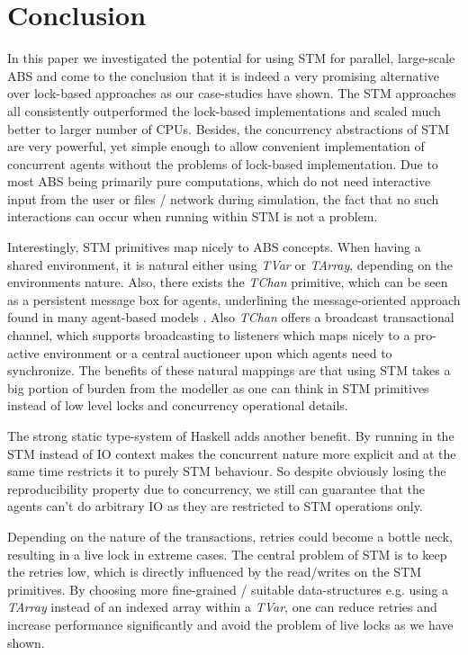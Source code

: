 \section{Conclusion} %
\label{sec:conclusion}

In this paper we investigated the potential for using STM for parallel, large-scale ABS and come to the conclusion that it is indeed a very promising alternative over lock-based approaches as our case-studies have shown. The STM approaches all consistently outperformed the lock-based implementations and scaled much better to larger number of CPUs. Besides, the concurrency abstractions of STM are very powerful, yet simple enough to allow convenient implementation of concurrent agents without the problems of lock-based implementation. Due to most ABS being primarily pure computations, which do not need interactive input from the user or files / network during simulation, the fact that no such interactions can occur when running within STM is not a problem. 

Interestingly, STM primitives map nicely to ABS concepts. When having a shared environment, it is natural either using \textit{TVar} or \textit{TArray}, depending on the environments nature. Also, there exists the \textit{TChan} primitive, which can be seen as a persistent message box for agents, underlining the message-oriented approach found in many agent-based models \cite{agha_actors:_1986, wooldridge_introduction_2009}. Also \textit{TChan} offers a broadcast transactional channel, which supports broadcasting to listeners which maps nicely to a pro-active environment or a central auctioneer upon which agents need to synchronize. The benefits of these natural mappings are that using STM takes a big portion of burden from the modeller as one can think in STM primitives instead of low level locks and concurrency operational details. 

The strong static type-system of Haskell adds another benefit. By running in the STM instead of IO context makes the concurrent nature more explicit and at the same time restricts it to purely STM behaviour. So despite obviously losing the reproducibility property due to concurrency, we still can guarantee that the agents can't do arbitrary IO as they are restricted to STM operations only.

Depending on the nature of the transactions, retries could become a bottle neck, resulting in a live lock in extreme cases. The central problem of STM is to keep the retries low, which is directly influenced by the read/writes on the STM primitives. By choosing more fine-grained / suitable data-structures e.g. using a \textit{TArray} instead of an indexed array within a \textit{TVar}, one can reduce retries and increase performance significantly and avoid the problem of live locks as we have shown.

